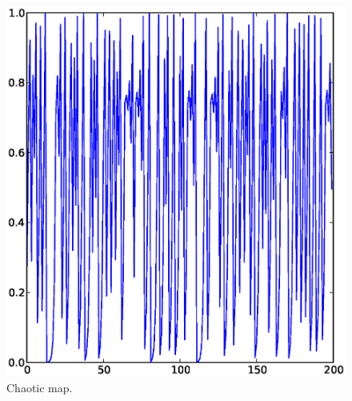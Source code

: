 \documentclass[12pt,twoside]{book}
\begin{document}
\begin{figure}[h]
  \begin{center}
    \includegraphics[scale=0.5]{logistic_map_mu4_x02}
  \end{center}
  \caption{
    Chaotic map.
  }
  \label{fig:logistic_map_chaotic}
\end{figure}
\end{document}

